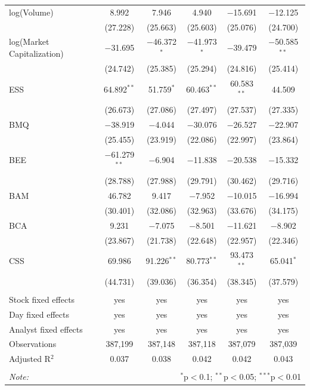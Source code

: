 \begin{tabular}{@{\extracolsep{5pt}}lccccc}
  log(Volume) & 8.992 & 7.946 & 4.940 & $-$15.691 & $-$12.125 \\ 
  & (27.228) & (25.663) & (25.603) & (25.076) & (24.700) \\ 
  log(Market Capitalization) & $-$31.695 & $-$46.372$^{*}$ & $-$41.973$^{*}$ & $-$39.479 & $-$50.585$^{**}$ \\ 
  & (24.742) & (25.385) & (25.294) & (24.816) & (25.414) \\ 
  ESS & 64.892$^{**}$ & 51.759$^{*}$ & 60.463$^{**}$ & 60.583$^{**}$ & 44.509 \\ 
  & (26.673) & (27.086) & (27.497) & (27.537) & (27.335) \\ 
  BMQ & $-$38.919 & $-$4.044 & $-$30.076 & $-$26.527 & $-$22.907 \\ 
  & (25.455) & (23.919) & (22.086) & (22.997) & (23.864) \\ 
  BEE & $-$61.279$^{**}$ & $-$6.904 & $-$11.838 & $-$20.538 & $-$15.332 \\ 
  & (28.788) & (27.988) & (29.791) & (30.462) & (29.716) \\ 
  BAM & 46.782 & 9.417 & $-$7.952 & $-$10.015 & $-$16.994 \\ 
  & (30.401) & (32.086) & (32.963) & (33.676) & (34.175) \\ 
  BCA & 9.231 & $-$7.075 & $-$8.501 & $-$11.621 & $-$8.902 \\ 
  & (23.867) & (21.738) & (22.648) & (22.957) & (22.346) \\ 
  CSS & 69.986 & 91.226$^{**}$ & 80.773$^{**}$ & 93.473$^{**}$ & 65.041$^{*}$ \\ 
  & (44.731) & (39.036) & (36.354) & (38.345) & (37.579) \\ 
 \hline \\[-1.8ex] 
Stock fixed effects & yes & yes & yes & yes & yes \\ 
Day fixed effects & yes & yes & yes & yes & yes \\ 
Analyst fixed effects & yes & yes & yes & yes & yes \\ 
Observations & 387,199 & 387,148 & 387,118 & 387,079 & 387,039 \\ 
Adjusted R$^{2}$ & 0.037 & 0.038 & 0.042 & 0.042 & 0.043 \\ 
\hline 
\hline \\[-1.8ex] 
\textit{Note:}  & \multicolumn{5}{r}{$^{*}$p$<$0.1; $^{**}$p$<$0.05; $^{***}$p$<$0.01} \\ 
\end{tabular} 
